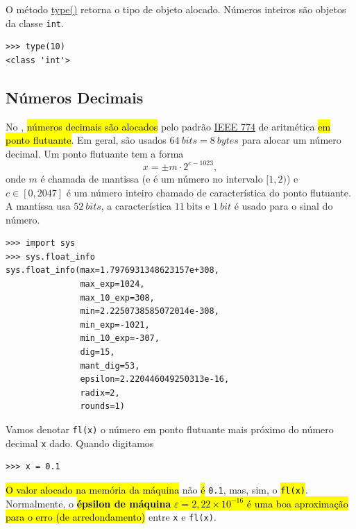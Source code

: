 \begin{obs}
  O método {\python} \href{https://docs.python.org/3/glossary.html#term-type}{type()} retorna o tipo de objeto alocado. Números inteiros são objetos da classe \lstinline+int+.
\begin{lstlisting}
>>> type(10)
<class 'int'>
\end{lstlisting}
\end{obs}

\subsection{Números Decimais}\label{cap_lingua_sec_numop:subsec:float}

No {\python}, \hl{números decimais são alocados} pelo padrão \href{https://en.wikipedia.org/wiki/IEEE\_754}{IEEE 774} de aritmética \hl{em ponto flutuante}. Em geral, são usados $64~\textit{bits} = 8~\textit{bytes}$ para alocar um número decimal. Um ponto flutuante tem a forma
\begin{equation}
  x = \pm m\cdot 2^{c-1023},
\end{equation}
onde $m$ é chamada de mantissa (e é um número no intervalo $[1,2)$) e $c\in [0, 2047]$ é um número inteiro chamado de característica do ponto flutuante. A mantissa usa $52~\textit{bits}$, a característica $11~\text{bits}$ e $1~\textit{bit}$ é usado para o sinal do número.

\begin{lstlisting}
>>> import sys
>>> sys.float_info
sys.float_info(max=1.7976931348623157e+308, 
               max_exp=1024, 
               max_10_exp=308, 
               min=2.2250738585072014e-308, 
               min_exp=-1021, 
               min_10_exp=-307, 
               dig=15, 
               mant_dig=53, 
               epsilon=2.220446049250313e-16, 
               radix=2, 
               rounds=1)
\end{lstlisting}

Vamos denotar \lstinline+fl(x)+ o número em ponto flutuante mais próximo do número decimal \lstinline+x+ dado. Quando digitamos
\begin{lstlisting}
>>> x = 0.1
\end{lstlisting}
\hl{O valor alocado na memória da máquina} não \hl{é} \lstinline+0.1+, mas, sim, o \hl{{\lstinline+fl(x)+}}. Normalmente, o \hl{\textbf{épsilon de máquina} $\varepsilon = 2,22\times 10^{-16}$ é uma boa aproximação para o erro (de arredondamento)} entre \lstinline+x+ e \lstinline+fl(x)+.

